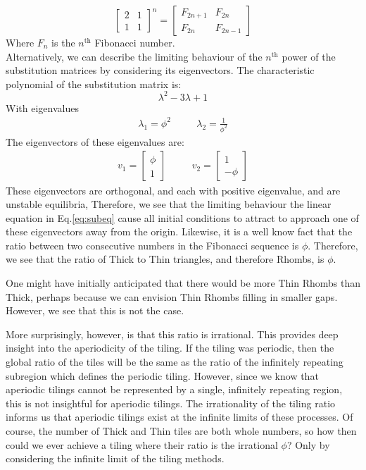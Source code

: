 \documentclass[
  oneside,
  11pt, a4paper,
  footinclude=true,
  headinclude=true,
  cleardoublepage=empty
]{scrbook}
\begin{document}
\begin{equation}
\begin{bmatrix}
2 & 1 \\
1 & 1
\end{bmatrix}^n= 
\begin{bmatrix}
F_{2n+1} & F_{2n} \\
F_{2n} & F_{2n-1}
\end{bmatrix}
\end{equation}
Where $F_n$ is the $n^{\text{th}}$ Fibonacci number.\\
Alternatively, we can describe the limiting behaviour of the $n^{\text{th}}$ power of the substitution matrices by considering its eigenvectors. The characteristic polynomial of the substitution matrix is:
\begin{equation}
\lambda^2-3\lambda+1
\end{equation}
With eigenvalues
\begin{align}
\lambda_1=\phi^2 &\quad
&\lambda_2=\frac{1}{\phi^2}
\end{align}
The eigenvectors of these eigenvalues are:
\begin{align}
v_1= \begin{bmatrix}
\phi \\
1
\end{bmatrix}
&\quad&
v_2= \begin{bmatrix}
1 \\
-\phi
\end{bmatrix}
\end{align}
These eigenvectors are orthogonal, and each with positive eigenvalue, and are unstable equilibria, Therefore, we see that the limiting behaviour the linear equation in Eq.\ref{eq:subeq} cause all initial conditions to attract to approach one of these eigenvectors away from the origin. Likewise, it is a well know fact that the ratio between two consecutive numbers in the Fibonacci sequence is $\phi$. Therefore, we see that the ratio of Thick to Thin triangles, and therefore Rhombs, is $\phi$.

One might have initially anticipated that there would be more Thin Rhombs than Thick, perhaps because we can envision Thin Rhombs filling in smaller gaps. However, we see that this is not the case.

More surprisingly, however, is that this ratio is irrational. This provides deep insight into the aperiodicity of the tiling. If the tiling was periodic, then the global ratio of the tiles will be the same as the ratio of the infinitely repeating subregion which defines the periodic tiling. However, since we know that aperiodic tilings cannot be represented by a single, infinitely repeating region, this is not insightful for aperiodic tilings. The irrationality of the tiling ratio informs us that aperiodic tilings exist at the infinite limits of these processes. Of course, the number of Thick and Thin tiles are both whole numbers, so how then could we ever achieve a tiling where their ratio is the irrational $\phi$? Only by considering the infinite limit of the tiling methods.
\end{document}
